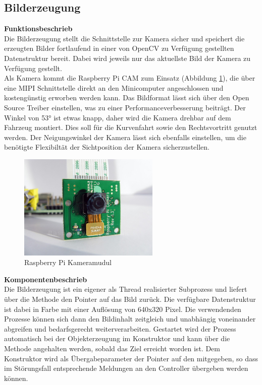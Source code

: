 \subsection{Bilderzeugung}
\textbf{Funktionsbeschrieb}\\[0.2cm]
Die Bilderzeugung stellt die Schnittstelle zur Kamera sicher und speichert die erzeugten Bilder fortlaufend in einer von OpenCV zu Verfügung gestellten Datenstruktur bereit. Dabei wird jeweils nur das aktuellste Bild der Kamera zu Verfügung gestellt.\\
Als Kamera kommt die Raspberry Pi CAM zum Einsatz (Abbildung \ref{fig:camera}), die über eine MIPI Schnittstelle direkt an den Minicomputer angeschlossen und kostengünstig erworben werden kann. Das Bildformat lässt sich über den Open Source Treiber einstellen, was zu einer Performanceverbesserung beiträgt. Der Winkel von 53° ist etwas knapp, daher wird die Kamera drehbar auf dem Fahrzeug montiert. Dies soll für die Kurvenfahrt sowie den Rechtsvortritt genutzt werden. Der Neigungswinkel der Kamera lässt sich ebenfalls einstellen, um die benötigte Flexibiltät der Sichtposition der Kamera sicherzustellen.
\begin{figure}[H]
\centering
\includegraphics[width=0.6\textwidth]{03_Loesungskonzept/pictures/raspberry-pi-camera-module.jpg}
\caption{Raspberry Pi Kameramudul}
\label{fig:camera}
\end{figure}
\textbf{Komponentenbeschrieb}\\[0.2cm]
Die Bilderzeugung ist ein eigener als Thread realisierter Subprozess und liefert über die Methode  den Pointer auf das Bild zurück. Die verfügbare Datenstruktur ist dabei  in Farbe mit einer Auflösung von 640x320 Pixel. Die verwendenden Prozesse können sich dann den Bildinhalt zeitgleich und unabhängig voneinander abgreifen und bedarfsgerecht weiterverarbeiten. Gestartet wird der Prozess automatisch bei der Objekterzeugung im Konstruktor und kann über die Methode  angehalten werden, sobald das Ziel erreicht worden ist. Dem Konstruktor wird als Übergabeparameter der Pointer auf den  mitgegeben, so dass im Störungsfall entsprechende Meldungen an den Controller übergeben werden können.\\[0.2cm]

